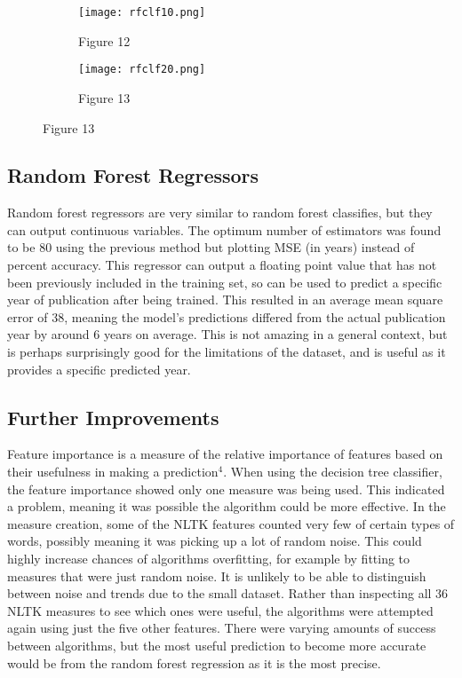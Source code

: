 \documentclass[11pt,a4paper,reqno]{amsart}
\begin{document}
\begin{figure}[!h]
\centering
\begin{subfigure}{.5\textwidth}
  \centering
  \texttt{[image: rfclf10.png]}
  \caption*{Figure 12}
\end{subfigure}%
\begin{subfigure}{.5\textwidth}
  \centering
  \texttt{[image: rfclf20.png]}
  \caption*{Figure 13}
\end{subfigure}
\end{figure}

\subsection{Random Forest Regressors}
Random forest regressors are very similar to random forest classifies, but they can output continuous variables. The optimum number of estimators was found to be 80 using the previous method but plotting MSE (in years) instead of percent accuracy. This regressor can output a floating point value that has not been previously included in the training set, so can be used to predict a specific year of publication after being trained. This resulted in an average mean square error of 38, meaning the model's predictions differed from the actual publication year by around 6 years on average. This is not amazing in a general context, but is perhaps surprisingly good for the limitations of the dataset, and is useful as it provides a specific predicted year.


\subsection{Further Improvements}
Feature importance is a measure of the relative importance of features based on their usefulness in making a prediction$^4$. When using the decision tree classifier, the feature importance showed only one measure was being used. This indicated a problem, meaning it was possible the algorithm could be more effective. In the measure creation, some of the NLTK features counted very few of certain types of words, possibly meaning it was picking up a lot of random noise. This could highly increase chances of algorithms overfitting, for example by fitting to measures that were just random noise. It is unlikely to be able to distinguish between noise and trends due to the small dataset. Rather than inspecting all 36 NLTK measures to see which ones were useful, the algorithms were attempted again using just the five other features. There were varying amounts of success between algorithms, but the most useful prediction to become more accurate would be from the random forest regression as it is the most precise.
\end{document}
